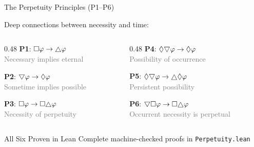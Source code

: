 \documentclass[aspectratio=169,11pt]{beamer}
\newcommand{\nec}{\Box}
\newcommand{\poss}{\Diamond}
\newcommand{\always}{\ensuremath \raisebox{-1.3pt}{$\triangle$}}
\newcommand{\sometimes}{\ensuremath \raisebox{1.3pt}{\rotatebox[origin=c]{180}{$\triangle$}}}
\newcommand{\imp}{\rightarrow}
\begin{document}
\begin{frame}{The Perpetuity Principles (P1--P6)}

Deep connections between necessity and time:

\vspace{0.3cm}

\begin{columns}
\begin{column}{0.48\textwidth}
\textbf{P1}: $\nec\varphi \imp \always\varphi$\\
{\small\textcolor{gray}{Necessary implies eternal}}

\vspace{0.3cm}

\textbf{P2}: $\sometimes\varphi \imp \poss\varphi$\\
{\small\textcolor{gray}{Sometime implies possible}}

\vspace{0.3cm}

\textbf{P3}: $\nec\varphi \imp \nec\always\varphi$\\
{\small\textcolor{gray}{Necessity of perpetuity}}
\end{column}
\begin{column}{0.48\textwidth}
\textbf{P4}: $\poss\sometimes\varphi \imp \poss\varphi$\\
{\small\textcolor{gray}{Possibility of occurrence}}

\vspace{0.3cm}

\textbf{P5}: $\poss\sometimes\varphi \imp \always\poss\varphi$\\
{\small\textcolor{gray}{Persistent possibility}}

\vspace{0.3cm}

\textbf{P6}: $\sometimes\nec\varphi \imp \nec\always\varphi$\\
{\small\textcolor{gray}{Occurrent necessity is perpetual}}
\end{column}
\end{columns}

\vspace{0.5cm}

\begin{alertblock}{All Six Proven in Lean}
\textcolor{provengreen}{\checkmark} Complete machine-checked proofs in \texttt{Perpetuity.lean}
\end{alertblock}

\end{frame}
\end{document}
